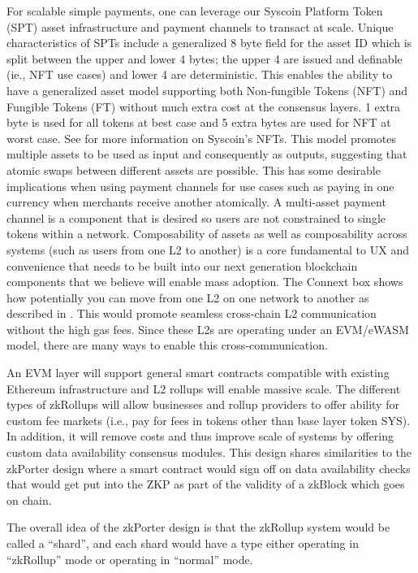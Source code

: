 \documentclass[peerreview]{ieeesyscoin}
\begin{document}
For scalable simple payments, one can leverage our Syscoin Platform Token (SPT) asset infrastructure and payment channels to transact at scale. Unique characteristics of SPTs include a generalized 8 byte field for the asset ID which is split between the upper and lower 4 bytes; the upper 4 are issued and definable (ie., NFT use cases) and lower 4 are deterministic. This enables the ability to have a generalized asset model supporting both Non-fungible Tokens (NFT) and Fungible Tokens (FT) without much extra cost at the consensus layers. 1 extra byte is used for all tokens at best case and 5 extra bytes are used for NFT at worst case. See \cite{NFT21} for more information on Syscoin’s NFTs. This model promotes multiple assets to be used as input and consequently as outputs, suggesting that  atomic swaps between different assets are possible. This has some desirable implications when using payment channels for use cases such as paying in one currency when merchants receive another atomically. A multi-asset payment channel is a component that is desired so users are not constrained to single tokens within a network. Composability of assets as well as composability across systems (such as users from one L2 to another) is a core fundamental to UX and convenience that needs to be built into our next generation blockchain components that we believe will enable mass adoption. The Connext box shows how potentially you can move from one L2 on one network to another as described in \cite{Bhu21}. This would promote seamless cross-chain L2 communication without the high gas fees. Since these L2s are operating under an EVM/eWASM model, there are many ways to enable this cross-communication.

An EVM layer will support general smart contracts compatible with existing Ethereum infrastructure and L2 rollups will enable massive scale. The different types of zkRollups will allow businesses and rollup providers to offer ability for custom fee markets (i.e., pay for fees in tokens other than base layer token SYS). In addition, it will remove costs and thus improve scale of systems by offering custom data availability consensus modules. This design shares similarities to the zkPorter \cite{matter21} design where a smart contract would sign off on data availability checks that would get put into the ZKP as part of the validity of a zkBlock which goes on chain.

The overall idea of the zkPorter design is that the zkRollup system would be called a “shard”, and each shard would have a type either operating in “zkRollup” mode or operating in “normal” mode. 
\end{document}
